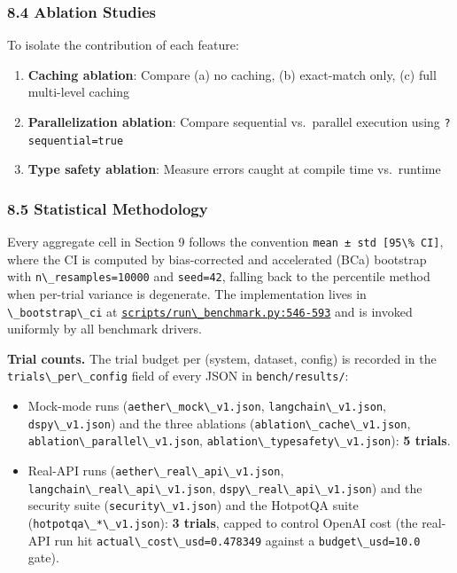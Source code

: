 \documentclass[
]{article}
\newcommand{\passthrough}[1]{#1}
\providecommand{\tightlist}{%
  \setlength{\itemsep}{0pt}\setlength{\parskip}{0pt}}
\begin{document}
\subsubsection{8.4 Ablation Studies}\label{ablation-studies}

To isolate the contribution of each feature:

\begin{enumerate}
\def\labelenumi{\arabic{enumi}.}
\tightlist
\item
  \textbf{Caching ablation}: Compare (a) no caching, (b) exact-match
  only, (c) full multi-level caching
\item
  \textbf{Parallelization ablation}: Compare sequential vs.~parallel
  execution using \passthrough{\lstinline!?sequential=true!}
\item
  \textbf{Type safety ablation}: Measure errors caught at compile time
  vs.~runtime
\end{enumerate}

\subsubsection{8.5 Statistical
Methodology}\label{statistical-methodology}

Every aggregate cell in Section 9 follows the convention
\passthrough{\lstinline!mean ± std [95\% CI]!}, where the CI is computed
by bias-corrected and accelerated (BCa) bootstrap with
\passthrough{\lstinline!n\_resamples=10000!} and
\passthrough{\lstinline!seed=42!}, falling back to the percentile method
when per-trial variance is degenerate. The implementation lives in
\passthrough{\lstinline!\_bootstrap\_ci!} at
\href{../scripts/run_benchmark.py}{\passthrough{\lstinline!scripts/run\_benchmark.py:546-593!}}
and is invoked uniformly by all benchmark drivers.

\textbf{Trial counts.} The trial budget per (system, dataset, config) is
recorded in the \passthrough{\lstinline!trials\_per\_config!} field of
every JSON in \passthrough{\lstinline!bench/results/!}:

\begin{itemize}
\tightlist
\item
  Mock-mode runs (\passthrough{\lstinline!aether\_mock\_v1.json!},
  \passthrough{\lstinline!langchain\_v1.json!},
  \passthrough{\lstinline!dspy\_v1.json!}) and the three ablations
  (\passthrough{\lstinline!ablation\_cache\_v1.json!},
  \passthrough{\lstinline!ablation\_parallel\_v1.json!},
  \passthrough{\lstinline!ablation\_typesafety\_v1.json!}): \textbf{5
  trials}.
\item
  Real-API runs (\passthrough{\lstinline!aether\_real\_api\_v1.json!},
  \passthrough{\lstinline!langchain\_real\_api\_v1.json!},
  \passthrough{\lstinline!dspy\_real\_api\_v1.json!}) and the security
  suite (\passthrough{\lstinline!security\_v1.json!}) and the HotpotQA
  suite (\passthrough{\lstinline!hotpotqa\_*\_v1.json!}): \textbf{3
  trials}, capped to control OpenAI cost (the real-API run hit
  \passthrough{\lstinline!actual\_cost\_usd=0.478349!} against a
  \passthrough{\lstinline!budget\_usd=10.0!} gate).
\end{itemize}
\end{document}
